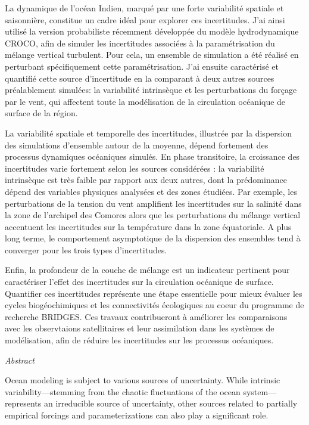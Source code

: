 \documentclass[
11pt, %
oneside, %
french, %
onehalfspacing, %
liststotoc, %
headsepline, %
chapterinoneline, %
]{MastersDoctoralThesis} %
\begin{document}
La dynamique de l’océan Indien, marqué par une forte variabilité spatiale et saisonnière, constitue un cadre idéal pour explorer ces incertitudes. J'ai ainsi utilisé la version probabiliste récemment développée du modèle hydrodynamique CROCO, afin de simuler les incertitudes associées à la paramétrisation du mélange vertical turbulent. Pour cela, un ensemble de simulation a été réalisé en perturbant spécifiquement cette paramétrisation. J'ai ensuite caractérisé et quantifié cette source d’incertitude en la comparant à deux autres sources préalablement simulées: la variabilité intrinsèque et les perturbations du forçage par le vent, qui affectent toute la modélisation de la circulation océanique de surface de la région.

La variabilité spatiale et temporelle des incertitudes, illustrée par la dispersion des simulations d’ensemble autour de la moyenne, dépend fortement des processus dynamiques océaniques simulés. En phase transitoire, la croissance des incertitudes varie fortement selon les sources considérées : la variabilité intrinsèque est très faible par rapport aux deux autres, dont la prédominance dépend des variables physiques analysées et des zones étudiées. Par exemple, les perturbations de la tension du vent amplifient les incertitudes sur la salinité dans la zone de l'archipel des Comores alors que les perturbations du mélange vertical accentuent les incertitudes sur la température dans la zone équatoriale. A plus long terme, le comportement asymptotique de la dispersion des ensembles tend à converger pour les trois types d’incertitudes.

Enfin, la profondeur de la couche de mélange est un indicateur pertinent pour caractériser l’effet des incertitudes sur la circulation océanique de surface. Quantifier ces incertitudes représente une étape essentielle pour mieux évaluer les cycles biogéochimiques et les connectivités écologiques au coeur du programme de recherche BRIDGES. Ces travaux contribueront à améliorer les comparaisons avec les observtaions satellitaires et leur assimilation dans les systèmes de modélisation, afin de réduire les incertitudes sur les processus océaniques.

\newpage
\begin{center}{\huge\textit{Abstract}\par}\end{center}

Ocean modeling is subject to various sources of uncertainty. While intrinsic variability—stemming from the chaotic fluctuations of the ocean system—represents an irreducible source of uncertainty, other sources related to partially empirical forcings and parameterizations can also play a significant role.
\end{document}

